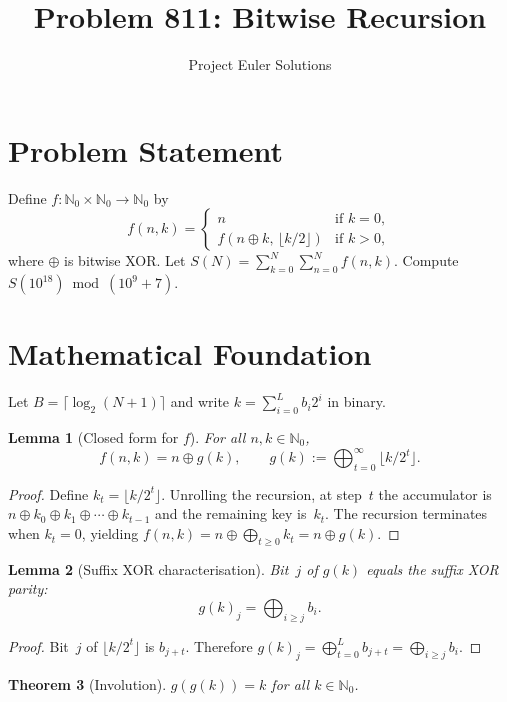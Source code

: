 \documentclass[11pt]{article}
\title{Problem 811: Bitwise Recursion}
\author{Project Euler Solutions}
\date{}
\newtheorem{theorem}{Theorem}
\newtheorem{lemma}[theorem]{Lemma}
\begin{document}
\maketitle

\section{Problem Statement}

Define $f : \mathbb{N}_0 \times \mathbb{N}_0 \to \mathbb{N}_0$ by
\[
f(n, k) = \begin{cases}
n & \text{if } k = 0, \\
f(n \oplus k,\, \lfloor k/2 \rfloor) & \text{if } k > 0,
\end{cases}
\]
where $\oplus$ is bitwise XOR. Let $S(N) = \sum_{k=0}^{N}\sum_{n=0}^{N} f(n,k)$. Compute $S(10^{18}) \bmod (10^9+7)$.

\section{Mathematical Foundation}

Let $B = \lceil \log_2(N+1) \rceil$ and write $k = \sum_{i=0}^{L} b_i 2^i$ in binary.

\begin{lemma}[Closed form for $f$]
\label{lem:closed}
For all $n, k \in \mathbb{N}_0$,
\[
f(n, k) = n \oplus g(k), \qquad g(k) := \bigoplus_{t=0}^{\infty} \lfloor k/2^t \rfloor.
\]
\end{lemma}

\begin{proof}
Define $k_t = \lfloor k/2^t \rfloor$. Unrolling the recursion, at step~$t$ the accumulator is $n \oplus k_0 \oplus k_1 \oplus \cdots \oplus k_{t-1}$ and the remaining key is~$k_t$. The recursion terminates when $k_t = 0$, yielding $f(n,k) = n \oplus \bigoplus_{t \ge 0} k_t = n \oplus g(k)$.
\end{proof}

\begin{lemma}[Suffix XOR characterisation]
\label{lem:suffix}
Bit~$j$ of $g(k)$ equals the suffix XOR parity:
\[
g(k)_j = \bigoplus_{i \ge j} b_i.
\]
\end{lemma}

\begin{proof}
Bit~$j$ of $\lfloor k/2^t \rfloor$ is $b_{j+t}$. Therefore $g(k)_j = \bigoplus_{t=0}^{L} b_{j+t} = \bigoplus_{i \ge j} b_i$.
\end{proof}

\begin{theorem}[Involution]
\label{thm:involution}
$g(g(k)) = k$ for all $k \in \mathbb{N}_0$.
\end{theorem}
\end{document}
